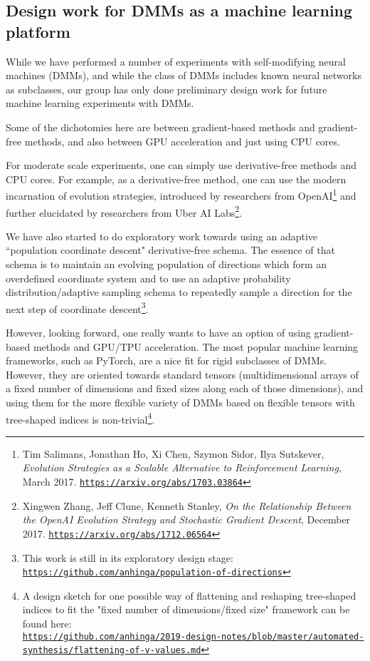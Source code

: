 \documentclass{article}
\begin{document}
\subsection{Design work for DMMs as a machine learning platform}

While we have performed a number of experiments with self-modifying neural machines (DMMs),
and while the class of DMMs includes known neural networks as subclasses,
our group has only done preliminary design work for future machine learning experiments with DMMs.

Some of the dichotomies here are between gradient-based methods and gradient-free methods,
and also between GPU acceleration and just using CPU cores.

For moderate scale experiments, one can simply use derivative-free methods and CPU cores.
For example, as a derivative-free method, one can use the modern incarnation of evolution strategies, introduced by researchers from OpenAI\footnote{Tim Salimans, Jonathan Ho, Xi Chen, Szymon Sidor, Ilya Sutskever, {\em Evolution Strategies as a Scalable Alternative to Reinforcement Learning}, March 2017.
\href{https://arxiv.org/abs/1703.03864}{\tt https://arxiv.org/abs/1703.03864}}  and
further elucidated by researchers from Uber AI Labs\footnote{Xingwen Zhang, Jeff Clune, Kenneth Stanley,
{\em On the Relationship Between the OpenAI Evolution Strategy and Stochastic Gradient Descent}, December 2017.
\href{https://arxiv.org/abs/1712.06564}{\tt https://arxiv.org/abs/1712.06564}}. 

We have also started to do
exploratory work towards using an adaptive ``population coordinate descent" derivative-free schema. The essence of
that schema is to maintain an evolving
population of directions which form an overdefined coordinate system and to use an adaptive probability distribution/adaptive
sampling schema to repeatedly sample a direction for the next step of coordinate descent\footnote{This work is
still in its exploratory design stage: 
\href{https://github.com/anhinga/population-of-directions}{\tt https://github.com/anhinga/population-of-directions}}.

However, looking forward, one really wants to have an option of using gradient-based methods and GPU/TPU
acceleration. The most popular machine learning frameworks, such as PyTorch, are a nice fit for rigid subclasses
of DMMs. However, they are oriented towards standard tensors (multidimensional arrays of a
fixed number of dimensions and fixed sizes along each of those dimensions), and using them for the more flexible variety of DMMs based on flexible tensors
with tree-shaped indices is non-trivial\footnote{A design sketch for one possible way of flattening and reshaping
tree-shaped indices to fit the "fixed number of dimensions/fixed size" framework can be found
here:\\
\href{https://github.com/anhinga/2019-design-notes/blob/master/automated-synthesis/flattening-of-v-values.md}
{\tt https://github.com/anhinga/2019-design-notes/blob/master/automated-synthesis/flattening-of-v-values.md}}.
\end{document}

